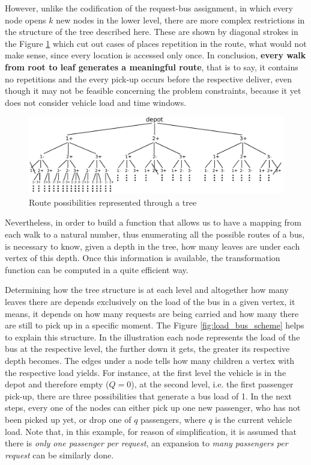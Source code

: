 \documentclass[tuberlin,cic,tc,openright,english,noabntcite,oneside]{iiufrgs}
\begin{document}
However, unlike the codification of the request-bus assignment, in which every node opens $k$ new nodes in the lower level, there are more complex restrictions in the structure of the tree described here. These are shown by diagonal strokes in the Figure \ref{fig:tree_bus_route} which cut out cases of places repetition in the route, what would not make sense, since every location is accessed only once. In conclusion, \textbf{every walk from root to leaf generates a meaningful route}, that is to say, it contains no repetitions and the every pick-up occurs before the respective deliver, even though it may not be feasible concerning the problem constraints, because it yet does not consider vehicle load and time windows.

\begin{figure}[H]
	\centering
    \caption{Route possibilities represented through a tree}
    \includegraphics[width=\textwidth]{fig_tree_bus_route}\par
    \label{fig:tree_bus_route}
\end{figure}

Nevertheless, in order to build a function that allows us to have a mapping from each walk to a natural number, thus enumerating all the possible routes of a bus, is necessary to know, given a depth in the tree, how many leaves are under each vertex of this depth. Once this information is available, the transformation function can be computed in a quite efficient way.

Determining how the tree structure is at each level and altogether how many leaves there are depends exclusively on the load of the bus in a given vertex, it means, it depends on how many requests are being carried and how many there are still to pick up in a specific moment. The Figure \ref{fig:load_bus_scheme} helps to explain this structure. In the illustration each node represents the load of the bus at the respective level, the further down it gets, the greater its respective depth becomes. The edges under a node tells how many children a vertex with the respective load yields. For instance, at the first level the vehicle is in the depot and therefore empty ($Q=0$), at the second level, i.e. the first passenger pick-up, there are three possibilities that generate a bus load of 1. In the next steps, every one of the nodes can either pick up one new passenger, who has not been picked up yet, or drop one of $q$ passengers, where $q$ is the current vehicle load. Note that, in this example, for reason of simplification, it is assumed that there is \emph{only one passenger per request}, an expansion to \emph{many passengers per request} can be similarly done.
\end{document}
